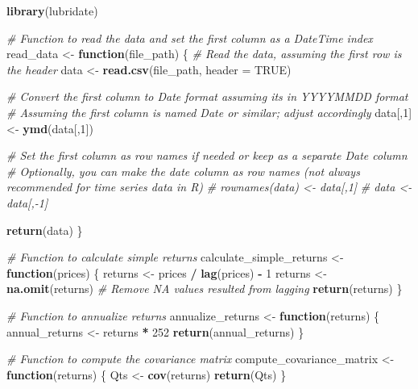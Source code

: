 \documentclass[
]{article}
\newenvironment{Shaded}{\begin{snugshade}}{\end{snugshade}}
\newcommand{\AttributeTok}[1]{\textcolor[rgb]{0.13,0.29,0.53}{#1}}
\newcommand{\CommentTok}[1]{\textcolor[rgb]{0.56,0.35,0.01}{\textit{#1}}}
\newcommand{\ConstantTok}[1]{\textcolor[rgb]{0.56,0.35,0.01}{#1}}
\newcommand{\ControlFlowTok}[1]{\textcolor[rgb]{0.13,0.29,0.53}{\textbf{#1}}}
\newcommand{\DecValTok}[1]{\textcolor[rgb]{0.00,0.00,0.81}{#1}}
\newcommand{\FunctionTok}[1]{\textcolor[rgb]{0.13,0.29,0.53}{\textbf{#1}}}
\newcommand{\NormalTok}[1]{#1}
\newcommand{\OtherTok}[1]{\textcolor[rgb]{0.56,0.35,0.01}{#1}}
\newcommand{\SpecialCharTok}[1]{\textcolor[rgb]{0.81,0.36,0.00}{\textbf{#1}}}
\begin{document}
\begin{Shaded}
\begin{Highlighting}[]
\FunctionTok{library}\NormalTok{(lubridate)}

\CommentTok{\# Function to read the data and set the first column as a DateTime index}
\NormalTok{read\_data }\OtherTok{\textless{}{-}} \ControlFlowTok{function}\NormalTok{(file\_path) \{}
  \CommentTok{\# Read the data, assuming the first row is the header}
\NormalTok{  data }\OtherTok{\textless{}{-}} \FunctionTok{read.csv}\NormalTok{(file\_path, }\AttributeTok{header =} \ConstantTok{TRUE}\NormalTok{)}
  
  \CommentTok{\# Convert the first column to Date format assuming it\textquotesingle{}s in \textquotesingle{}YYYYMMDD\textquotesingle{} format}
  \CommentTok{\# Assuming the first column is named \textquotesingle{}Date\textquotesingle{} or similar; adjust accordingly}
\NormalTok{  data[,}\DecValTok{1}\NormalTok{] }\OtherTok{\textless{}{-}} \FunctionTok{ymd}\NormalTok{(data[,}\DecValTok{1}\NormalTok{])}
  
  \CommentTok{\# Set the first column as row names if needed or keep as a separate Date column}
  \CommentTok{\# Optionally, you can make the date column as row names (not always recommended for time series data in R)}
  \CommentTok{\# rownames(data) \textless{}{-} data[,1]}
  \CommentTok{\# data \textless{}{-} data[,{-}1]}
  
  \FunctionTok{return}\NormalTok{(data)}
\NormalTok{\}}

\CommentTok{\# Function to calculate simple returns}
\NormalTok{calculate\_simple\_returns }\OtherTok{\textless{}{-}} \ControlFlowTok{function}\NormalTok{(prices) \{}
\NormalTok{  returns }\OtherTok{\textless{}{-}}\NormalTok{ prices }\SpecialCharTok{/} \FunctionTok{lag}\NormalTok{(prices) }\SpecialCharTok{{-}} \DecValTok{1}
\NormalTok{  returns }\OtherTok{\textless{}{-}} \FunctionTok{na.omit}\NormalTok{(returns)  }\CommentTok{\# Remove NA values resulted from lagging}
  \FunctionTok{return}\NormalTok{(returns)}
\NormalTok{\}}

\CommentTok{\# Function to annualize returns}
\NormalTok{annualize\_returns }\OtherTok{\textless{}{-}} \ControlFlowTok{function}\NormalTok{(returns) \{}
\NormalTok{  annual\_returns }\OtherTok{\textless{}{-}}\NormalTok{ returns }\SpecialCharTok{*} \DecValTok{252}
  \FunctionTok{return}\NormalTok{(annual\_returns)}
\NormalTok{\}}

\CommentTok{\# Function to compute the covariance matrix}
\NormalTok{compute\_covariance\_matrix }\OtherTok{\textless{}{-}} \ControlFlowTok{function}\NormalTok{(returns) \{}
\NormalTok{  Qts }\OtherTok{\textless{}{-}} \FunctionTok{cov}\NormalTok{(returns)}
  \FunctionTok{return}\NormalTok{(Qts)}
\NormalTok{\}}
\end{Highlighting}
\end{Shaded}
\end{document}

